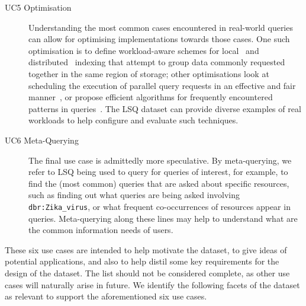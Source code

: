 \begin{description}
\item[UC5 Optimisation] Understanding the most common cases encountered in real-world queries can allow for optimising implementations towards those cases. One such optimisation is to define workload-aware schemes for local~\cite{AlucOD14,AlucOD19} and distributed~\cite{HoseS13,CureNBA15a,Al-HarbiAKMES16} indexing that attempt to group data commonly requested together in the same region of storage; other optimisations look at scheduling the execution of parallel query requests in an effective and fair manner~\cite{MaaliHD14}, or propose efficient algorithms for frequently encountered patterns in queries~\cite{MartensT18}. The LSQ dataset can provide diverse examples of real workloads to help configure and evaluate such techniques.
\item[UC6 Meta-Querying] The final use case is admittedly more speculative. By meta-querying, we refer to LSQ being used to query for queries of interest, for example, to find the (most common) queries that are asked about specific resources, such as finding out what queries are being asked involving \texttt{dbr:Zika\_virus}, or what frequent co-occurrences of resources appear in queries. Meta-querying along these lines may help to understand what are the common information needs of users.%
\end{description}

These six use cases are intended to help motivate the dataset, to give ideas of potential applications, and also to help distil some key requirements for the design of the dataset. The list should not be considered complete, as other use cases will naturally arise in future. We identify the following facets of the dataset as relevant
to support the aforementioned six use cases.

